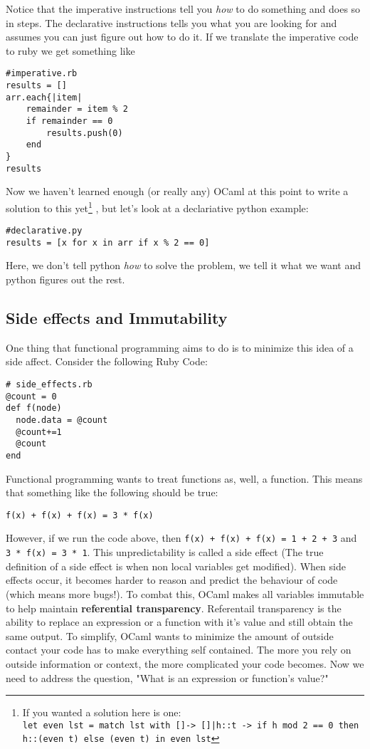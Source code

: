\documentclass[main.tex]{subfiles}
\begin{document}
Notice that the imperative instructions tell you \textit{how} to do something and does so in steps. The declarative instructions tells you what you are looking for and assumes you can just figure out how to do it. If we translate the imperative code to ruby we get something like
\begin{lstlisting}[style=Myrubystyle]
#imperative.rb
results = []
arr.each{|item|
    remainder = item % 2
    if remainder == 0
        results.push(0)
    end
}
results
\end{lstlisting}
Now we haven't learned enough (or really any) OCaml at this point to write a solution to this yet\footnote{
If you wanted a solution here is one:\\
\texttt{let even lst = match lst with []-> []|h::t -> if h mod 2 == 0 then h::(even t) else (even t) in even lst}
}
, but let's look at a declariative python example:
\begin{lstlisting}[style=Myrubystyle]
#declarative.py
results = [x for x in arr if x % 2 == 0] 
\end{lstlisting}
Here, we don't tell python \textit{how} to solve the problem, we tell it what we want and python figures out the rest. 

\subsection{Side effects and Immutability}
One thing that functional programming aims to do is to minimize this idea of a side affect. Consider the following Ruby Code:
\begin{lstlisting}[style=Myrubystyle]
# side_effects.rb
@count = 0
def f(node)
  node.data = @count
  @count+=1
  @count
end
\end{lstlisting}
Functional programming wants to treat functions as, well, a function. This means that something like the following should be true:
\begin{lstlisting}
f(x) + f(x) + f(x) = 3 * f(x)
\end{lstlisting}
However, if we run the code above, then \texttt{f(x) + f(x) + f(x) = 1 + 2 + 3} and \texttt{3 * f(x) = 3 * 1}. This unpredictability is called a side effect (The true definition of a side effect is when non local variables get modified). 
When side effects occur, it becomes harder to reason and predict the behaviour of code (which means more bugs!).
To combat this, OCaml makes all variables immutable to help maintain \textbf{referential transparency}. Referentail transparency is the ability to replace an expression or a function with it's value and still obtain the same output. To simplify, OCaml wants to minimize the amount of outside contact your code has to make everything self contained. The more you rely on outside information or context, the more complicated your code becomes. Now we need to address the question, "What is an expression or function's value?"
\end{document}
